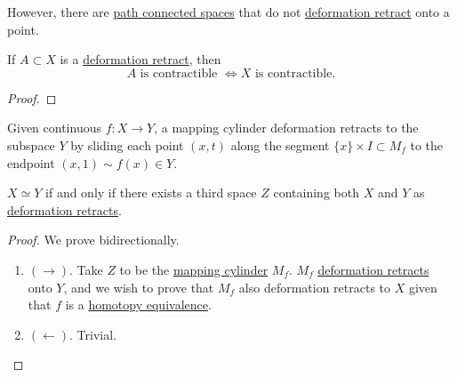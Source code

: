 	However, there are \hyperref[pst-def:path-connected-space]{path connected spaces} that do not \hyperref[def:deformation-retract]{deformation retract} onto a point. 

	\begin{example}[Retracts]
	  \label{ex:retracts-2}

	\end{example}

	\begin{theorem}
	  \label{thm:deformation-retract-preserves-contractiblity}
	  If $A \subset X$ is a \hyperref[def:deformation-retract]{deformation retract}, then 
		\begin{equation}
			A \text{ is contractible } \iff X \text{ is contractible}. 
		\end{equation}
	\end{theorem}
	\begin{proof}
	  
	\end{proof}

	\begin{example}
	  \label{ex:deformation-retracts-of-mapping-cylinders}
		Given continuous $f: X \to Y$, a mapping cylinder deformation retracts to the subspace $Y$ by sliding each point $(x, t)$ along the segment $\{x\} \times I \subset M_f$ to the endpoint $(x, 1) \sim f(x) \in Y$. 
	\end{example}

	\begin{theorem}
	  \label{thm:homotopy-equivalence-via-a-common-deformation}
	  $X \simeq Y$ if and only if there exists a third space $Z$ containing both $X$ and $Y$ as \hyperref[def:deformation-retract]{deformation retracts}. 
	\end{theorem}
	\begin{proof}
	  We prove bidirectionally. 
		\begin{enumerate}
		  \item $(\rightarrow)$. Take $Z$ to be the \hyperref[def:mapping-cylinder]{mapping cylinder} $M_f$. $M_f$ \hyperref[def:deformation-retract]{deformation retracts} onto $Y$, and we wish to prove that $M_f$ also deformation retracts to $X$ given that $f$ is a \hyperref[def:homotopy-equivalence]{homotopy equivalence}. 
			\item $(\leftarrow)$. Trivial. 
		\end{enumerate}
	\end{proof}

